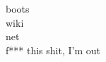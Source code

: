 \documentclass[twoside]{article}
\begin{document}
\begin{multicols}{2}


{}
boots\\
wiki\\
net \\
f*** this shit, I'm out\\




\end{multicols}
\end{document}

